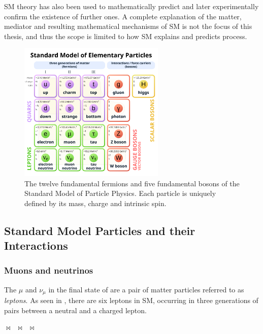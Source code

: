         SM theory has also been used to mathematically predict and later experimentally confirm the existence of further ones.
        A complete explanation of the matter, mediator and resulting mathematical mechanisms of SM is not the focus of this thesis, and thus the scope is limited to how SM explains and predicts \Bmunu process.\\ 
        \begin{figure}[htpb]
            \centering
            \includegraphics[width=0.62\textwidth]{./Intro/Figures/1024px-Standard_Model_of_Elementary_Particles.svg.png}
            \caption[The twelve fundamental fermions and five fundamental bosons of the Standard Model of Particle Physics. Each particle is uniquely defined by its mass, charge and intrinsic spin.]{The twelve fundamental fermions and five fundamental bosons of the Standard Model of Particle Physics\cite{pic:SM}. Each particle is uniquely defined by its mass, charge and intrinsic spin.} 
            \label{fig:SM}
        \end{figure}
        \subsection{Standard Model Particles and their Interactions}
            \subsubsection{Muons and neutrinos}
                The $\mu$ and $\nu_\mu$ in the final state of \Bmunu are a pair of matter particles referred to as \textit{leptons}.
                As seen in , there are six leptons in SM, occurring in three generations of pairs between a neutral and a charged lepton.

\begin{center}
  $\bowtie$~$\bowtie$~$\bowtie$
\end{center}
